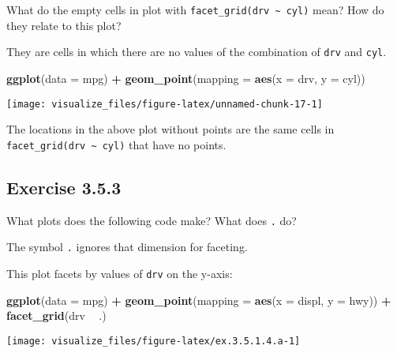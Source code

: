 \documentclass[]{book}
\newenvironment{Shaded}{\begin{snugshade}}{\end{snugshade}}
\newcommand{\DataTypeTok}[1]{\textcolor[rgb]{0.13,0.29,0.53}{#1}}
\newcommand{\KeywordTok}[1]{\textcolor[rgb]{0.13,0.29,0.53}{\textbf{#1}}}
\newcommand{\NormalTok}[1]{#1}
\newcommand{\OperatorTok}[1]{\textcolor[rgb]{0.81,0.36,0.00}{\textbf{#1}}}
\newcommand{\StringTok}[1]{\textcolor[rgb]{0.31,0.60,0.02}{#1}}
\theoremstyle{plain}
\theoremstyle{remark}
\begin{document}
What do the empty cells in plot with
\texttt{facet\_grid(drv\ \textasciitilde{}\ cyl)} mean? How do they
relate to this plot?

They are cells in which there are no values of the combination of
\texttt{drv} and \texttt{cyl}.

\begin{Shaded}
\begin{Highlighting}[]
\KeywordTok{ggplot}\NormalTok{(}\DataTypeTok{data =}\NormalTok{ mpg) }\OperatorTok{+}
\StringTok{  }\KeywordTok{geom_point}\NormalTok{(}\DataTypeTok{mapping =} \KeywordTok{aes}\NormalTok{(}\DataTypeTok{x =}\NormalTok{ drv, }\DataTypeTok{y =}\NormalTok{ cyl))}
\end{Highlighting}
\end{Shaded}

\begin{center}\texttt{[image: visualize\_files/figure-latex/unnamed-chunk-17-1]} \end{center}

The locations in the above plot without points are the same cells in
\texttt{facet\_grid(drv\ \textasciitilde{}\ cyl)} that have no points.

\hypertarget{exercise-3.5.3}{%
\subsection*{\texorpdfstring{Exercise
{3.5.3}}{Exercise 3.5.3}}\label{exercise-3.5.3}}

What plots does the following code make? What does \texttt{.} do?

The symbol \texttt{.} ignores that dimension for faceting.

This plot facets by values of \texttt{drv} on the y-axis:

\begin{Shaded}
\begin{Highlighting}[]
\KeywordTok{ggplot}\NormalTok{(}\DataTypeTok{data =}\NormalTok{ mpg) }\OperatorTok{+}
\StringTok{  }\KeywordTok{geom_point}\NormalTok{(}\DataTypeTok{mapping =} \KeywordTok{aes}\NormalTok{(}\DataTypeTok{x =}\NormalTok{ displ, }\DataTypeTok{y =}\NormalTok{ hwy)) }\OperatorTok{+}
\StringTok{  }\KeywordTok{facet_grid}\NormalTok{(drv }\OperatorTok{~}\StringTok{ }\NormalTok{.)}
\end{Highlighting}
\end{Shaded}

\begin{center}\texttt{[image: visualize\_files/figure-latex/ex.3.5.1.4.a-1]} \end{center}
\end{document}
